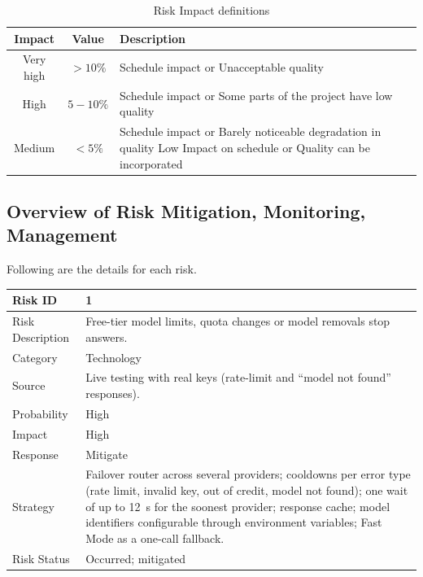 \begin{table}[!htbp]
\begin{center}
\def\arraystretch{1.5}
\begin{tabularx}{\textwidth}{| c | c | X |}
\hline
Impact & Value	& Description \\ \hline
Very high &	$> 10 \%$ & Schedule impact or Unacceptable quality \\ \hline
High &	$5-10 \%$ & Schedule impact or Some parts of the project have low quality \\ \hline
Medium	& $ < 5 \% $ & Schedule impact or Barely noticeable degradation in quality Low	Impact on schedule or Quality can be incorporated \\ \hline
\end{tabularx}
\end{center}
\caption{Risk Impact definitions \cite{bookPressman}}
\label{tab:riskImpactDef}
\end{table}

\subsection{Overview of Risk Mitigation, Monitoring, Management}


Following are the details for each risk.
\begin{table}[!htbp]
\begin{center}
\def\arraystretch{1.5}
\begin{tabularx}{\textwidth}{| l | X |}
\hline
Risk ID	& 1 \\ \hline
Risk Description	& Free-tier model limits, quota changes or model removals stop answers. \\ \hline
Category	& Technology \\ \hline
Source	& Live testing with real keys (rate-limit and ``model not found'' responses). \\ \hline
Probability	& High \\ \hline
Impact	& High \\ \hline
Response	& Mitigate \\ \hline
Strategy	& Failover router across several providers; cooldowns per error type (rate limit, invalid key, out of credit, model not found); one wait of up to 12~s for the soonest provider; response cache; model identifiers configurable through environment variables; Fast Mode as a one-call fallback. \\ \hline
Risk Status	& Occurred; mitigated \\ \hline
\end{tabularx}
\end{center}
\label{tab:risk1}
\end{table}

